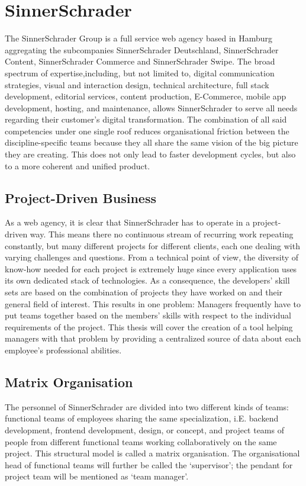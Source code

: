 \chapter{SinnerSchrader}

The SinnerSchrader Group is a full service web agency based in Hamburg aggregating the subcompanies SinnerSchrader Deutschland, SinnerSchrader Content, SinnerSchrader Commerce and SinnerSchrader Swipe. The broad spectrum of expertise,including, but not limited to, digital communication strategies, visual and interaction design,  technical architecture, full stack development, editorial services, content production, E-Commerce, mobile app development, hosting, and maintenance, allows SinnerSchrader to serve all needs regarding their customer’s digital transformation. The combination of all said competencies under one single roof reduces organisational friction between the discipline-specific teams because they all share the same vision of the big picture they are creating. This does not only lead to faster development cycles, but also to a more coherent and unified product.

\section{Project-Driven Business}
As a web agency, it is clear that SinnerSchrader has to operate in a project-driven way. This means there no continuous stream of recurring work repeating constantly, but many different projects for different clients, each one dealing with varying challenges and questions. From a technical point of view, the diversity of know-how needed for each project is extremely huge since every application uses its own dedicated stack of technologies. As a consequence, the developers’ skill sets are based on the combination of projects they have worked on and their general field of interest. This results in one problem: Managers frequently have to put teams together based on the members’ skills with respect to the individual requirements of the project.\newline
This thesis will cover the creation of a tool helping managers with that problem by providing a centralized source of data about each employee’s professional abilities.
\newpage
\section{Matrix Organisation}
The personnel of SinnerSchrader are divided into two different kinds of teams: functional teams of
employees sharing the same specialization, i.E. backend development, frontend development, design, or concept, and project teams of people from different functional teams working collaboratively on the same project. This structural model is called a matrix organisation. \cite[P. 75]{BWL}
The organisational head of functional teams will further be called the `supervisor'; the pendant for project team will be mentioned as `team manager'.

